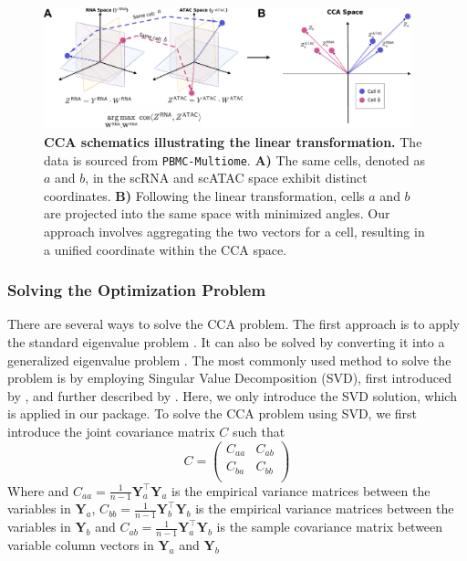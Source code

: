 \begin{figure}[!ht]
	\centering
	\includegraphics[width=0.95\textwidth]{CCA_ADD/fig}
	\vspace{0.1cm}
	\caption[CCA schematic showing the linear transformation.]{\textbf{CCA schematics illustrating the linear transformation.} The data is sourced from \texttt{PBMC-Multiome}. \textbf{A)} The same cells, denoted as $a$ and $b$, in the scRNA and scATAC space exhibit distinct coordinates. \textbf{B)} Following the linear transformation, cells $a$ and $b$ are projected into the same space with minimized angles. Our approach involves aggregating the two vectors for a cell, resulting in a unified coordinate within the CCA space.}
	\label{fig:CCA_ADD}
\end{figure}

\subsubsection{Solving the Optimization Problem}
There are several ways to solve the CCA problem. The first approach is to apply the standard eigenvalue problem \citep{HOTELLING1936cca2,hooper1959ccaeigen}. It can also be solved by converting it into a generalized eigenvalue problem \citep{bach2002kernel,hardoon2004canonical}. The most commonly used method to solve the problem is by employing Singular Value Decomposition (SVD), first introduced by \citep{healy1957ccasvd}, and further described by \citep{ewerbring1989canonical}. Here, we only introduce the SVD solution, which is applied in our package.
To solve the CCA problem using SVD, we first introduce the joint covariance matrix $C$ such that
\begin{equation}
	C = \begin{pmatrix}
		C_{aa} & C_{ab}\\
		C_{ba} & C_{bb}\\
	\end{pmatrix}	
\end{equation}
Where  and $C_{aa} = \frac{1}{n-1} \mathbf{Y}_a^\top \mathbf{Y}_a$ is the empirical variance matrices between the variables in $\mathbf{Y}_a$, $C_{bb} = \frac{1}{n-1} \mathbf{Y}_b^\top \mathbf{Y}_b$ is the empirical variance matrices between the variables in $\mathbf{Y}_b$ and $C_{ab} = \frac{1}{n-1} \mathbf{Y}_a^\top \mathbf{Y}_b$ is the sample covariance matrix between variable column vectors in $\mathbf{Y}_a$ and $\mathbf{Y}_b$

